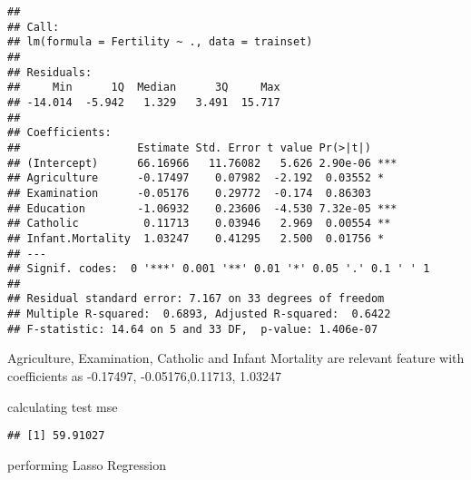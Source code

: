\documentclass[
]{article}
\newenvironment{Shaded}{\begin{snugshade}}{\end{snugshade}}
\newcommand{\DecValTok}[1]{\textcolor[rgb]{0.00,0.00,0.81}{#1}}
\newcommand{\FunctionTok}[1]{\textcolor[rgb]{0.00,0.00,0.00}{#1}}
\newcommand{\NormalTok}[1]{#1}
\newcommand{\OtherTok}[1]{\textcolor[rgb]{0.56,0.35,0.01}{#1}}
\newcommand{\SpecialCharTok}[1]{\textcolor[rgb]{0.00,0.00,0.00}{#1}}
\begin{document}
\begin{verbatim}
## 
## Call:
## lm(formula = Fertility ~ ., data = trainset)
## 
## Residuals:
##     Min      1Q  Median      3Q     Max 
## -14.014  -5.942   1.329   3.491  15.717 
## 
## Coefficients:
##                  Estimate Std. Error t value Pr(>|t|)    
## (Intercept)      66.16966   11.76082   5.626 2.90e-06 ***
## Agriculture      -0.17497    0.07982  -2.192  0.03552 *  
## Examination      -0.05176    0.29772  -0.174  0.86303    
## Education        -1.06932    0.23606  -4.530 7.32e-05 ***
## Catholic          0.11713    0.03946   2.969  0.00554 ** 
## Infant.Mortality  1.03247    0.41295   2.500  0.01756 *  
## ---
## Signif. codes:  0 '***' 0.001 '**' 0.01 '*' 0.05 '.' 0.1 ' ' 1
## 
## Residual standard error: 7.167 on 33 degrees of freedom
## Multiple R-squared:  0.6893, Adjusted R-squared:  0.6422 
## F-statistic: 14.64 on 5 and 33 DF,  p-value: 1.406e-07
\end{verbatim}

Agriculture, Examination, Catholic and Infant Mortality are relevant
feature with coefficients as -0.17497, -0.05176,0.11713, 1.03247

calculating test mse

\begin{Shaded}
\end{Shaded}

\begin{verbatim}
## [1] 59.91027
\end{verbatim}

performing Lasso Regression

\begin{Shaded}
\end{Shaded}
\end{document}
